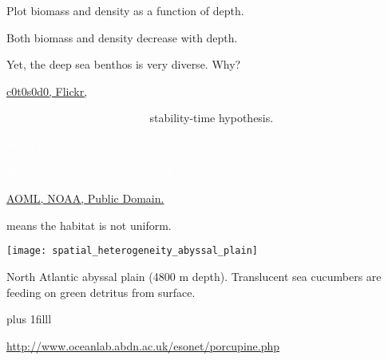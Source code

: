 \documentclass[t]{beamer}
\begin{document}
{
\begin{frame}[t]{Plot biomass and density as a function of depth.}

\end{frame}}

%

{
\begin{frame}[t]{Both biomass and density decrease with depth.}

\vspace*{10\baselineskip}

\hangpara Yet, the deep sea benthos is very diverse. Why?
\end{frame}}

%

{
\begin{frame}

\vfilll

\tiny \href{https://flickr.com/photos/c0t0s0d0/3169502387/}{c0t0s0d0, Flickr, }
\end{frame}
}

%

{
\begin{frame}[t]{\textcolor{white}{Sanders (1968) proposed the} \textcolor{orange4}{stability-time hypothesis.}} 

	\hangpara \textcolor{white}{What is the importance of stability and time?}

	\hangpara \textcolor{white}{What were the arguments against this hypothesis?}

\tinyfill\textcolor{white}{\href{https://www.aoml.noaa.gov/deep-sea-is-slowing-warming/}{AOML, NOAA, Public Domain.}}

\end{frame}
}
%

\begin{frame}[t]{ means the habitat is not uniform.}

	{\centering
	\texttt{[image: spatial\_heterogeneity\_abyssal\_plain]}\par}

	\vspace*{-\baselineskip}\hangpara North Atlantic abyssal plain (4800 m depth). Translucent sea cucumbers are feeding on green detritus from surface.

\vskip0pt plus 1filll

\hfill\tiny\url{http://www.oceanlab.abdn.ac.uk/esonet/porcupine.php}
\end{frame}
\end{document}
